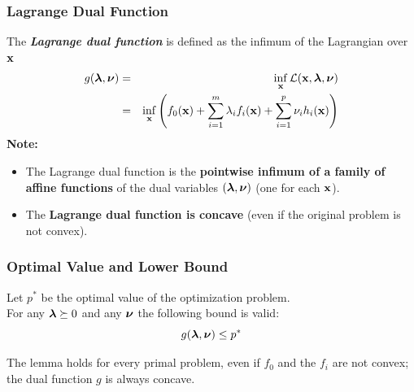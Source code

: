 \subsubsection{Lagrange Dual Function}

      The \textbf{\emph{Lagrange dual function}} is defined as the infimum of the Lagrangian over $\bm{\mathrm{x}}$
     \begin{eqnarray*}
       g(\bm{\mathrm{\lambda}},\bm{\mathrm{\nu}}) 
         & = & \inf_{\bm{\mathrm{x}}}\mathcal L(\bm{\mathrm{x}},\bm{\mathrm{\lambda}}, \bm{\mathrm{\nu}}) \\   
         & = & \inf_{\bm{\mathrm{x}}} \left(   
                                f_0(\bm{\mathrm{x}}) + \sum_{i=1}^m\lambda_i f_i(\bm{\mathrm{x}}) +     \sum_{i=1}^p\nu_i h_i(\bm{\mathrm{x}})
                              \right)
    \end{eqnarray*}
  \textbf{Note:} 
  \begin{itemize}
    \item The Lagrange dual function is the \textbf{pointwise infimum of a family of affine functions} of the dual variables $(\bm{\mathrm{\lambda}},\bm{\mathrm{\nu}})$ (one for each $\bm{\mathrm{x}}$). 
    \item The \textbf{Lagrange dual function is concave} (even if the original problem is not convex).
  \end{itemize}

  \subsubsection{Optimal Value and Lower Bound}

  \begin{lemma}
    Let $p^*$ be the optimal value of the optimization problem. \\
    For any $\bm{\mathrm{\lambda}} \succeq 0$ and any $\bm{\mathrm{\nu}}$ the following bound is valid:
    \begin{displaymath}
      g(\bm{\mathrm{\lambda}},\bm{\mathrm{\nu}}) \leq p^* 
    \end{displaymath} 
  \end{lemma}
   
   The lemma holds for every primal problem, even if $f_0$ and the $f_i$ are not convex; the dual function $g$ is always concave.

